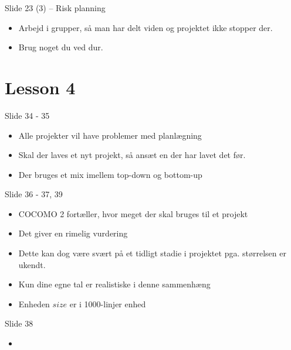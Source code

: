 \documentclass[a4, 10pt]{article}
\begin{document}
Slide 23 (3) -- Risk planning
\begin{itemize}
	\item Arbejd i grupper, så man har delt viden og projektet ikke stopper der.
	\item Brug noget du ved dur.
\end{itemize}






\newpage
\section*{Lesson 4}

Slide 34 - 35
 \begin{itemize}
 	\item Alle projekter vil have problemer med planlægning
 	\item Skal der laves et nyt projekt, så ansæt en der har lavet det før.
 	\item Der bruges et mix imellem top-down og bottom-up
 \end{itemize}
 Slide 36 - 37, 39
 \begin{itemize}
 	\item COCOMO 2 fortæller, hvor meget der skal bruges til et projekt
 	\item Det giver en rimelig vurdering
 	\item Dette kan dog være svært på et tidligt stadie i projektet pga. størrelsen er ukendt.
 	\item Kun dine egne tal er realistiske i denne sammenhæng
 	\item Enheden $size$ er i 1000-linjer enhed
 \end{itemize}
 Slide 38
 \begin{itemize}
 	\item 
 \end{itemize}
\end{document}
